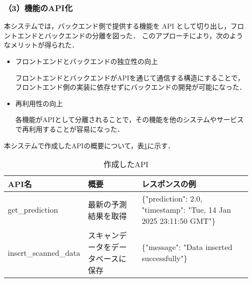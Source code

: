 \subsubsection*{（3）機能のAPI化}
本システムでは，バックエンド側で提供する機能を API として切り出し，フロントエンドとバックエンドの分離を図った．
このアプローチにより，次のようなメリットが得られた．

\begin{itemize}
	\item フロントエンドとバックエンドの独立性の向上
	
	フロントエンドとバックエンドがAPIを通じて通信する構造にすることで，フロントエンド側の実装に依存せずにバックエンドの開発が可能になった．
	
	\item 再利用性の向上
	 
	各機能がAPIとして分離されることで，その機能を他のシステムやサービスで再利用することが容易になった．
	
\end{itemize}

本システムで作成したAPIの概要について，表\ref{tbl:API}に示す．

\begin{table}[tb]
	\centering
	\caption{作成したAPI}
	\label{tbl:API}
	\small
	\doublerulesep=0.3pt
    \begin{tabular}{l|l|p{6cm}} \hline\hline\hline
		API名 & 概要 & レスポンスの例 \\ \hline
		get\_prediction & 最新の予測結果を取得 & \{"prediction": 2.0, "timestamp": "Tue, 14 Jan 2025 23:11:50 GMT"\} \\ \hline
		insert\_scanned\_data & スキャンデータをデータベースに保存 & \{"message": "Data inserted successfully"\} \\ \hline\hline\hline
	\end{tabular}
\end{table}